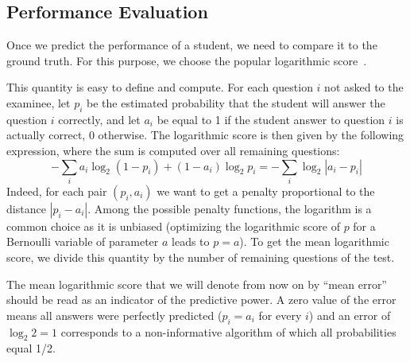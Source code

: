 \documentclass{edm_template}
\begin{document}
\subsection{Performance Evaluation}

Once we predict the performance of a student, we need to compare it to the ground truth. For this purpose, we choose the popular logarithmic score~\cite{Gneiting2007}. 

This quantity is easy to define and compute. For each question $i$ not asked to the examinee, let $p_i$ be the estimated probability that the student will answer the question $i$ correctly, and let $a_i$ be equal to 1 if the student answer to question $i$ is actually correct, 0 otherwise. The logarithmic score is then given by the following expression, where the sum is computed over all remaining questions: 
\[ - \sum_i a_i \log_2 (1 - p_i) + (1-a_i) \log_2 p_i = - \sum_i \log_2 | a_i - p_i | \]
Indeed, for each pair $(p_i, a_i)$ we want to get a penalty proportional to the distance $|p_i - a_i|$. Among the possible penalty functions, the logarithm is a common choice as it is unbiased (optimizing the logarithmic score of $p$ for a Bernoulli variable of parameter $a$ leads to $p=a$). To get the mean logarithmic score, we divide this quantity by the number of remaining questions of the test.

The mean logarithmic score that we will denote from now on by ``mean error'' should be read as an indicator of the predictive power. A zero value of the error means all answers were perfectly predicted ($p_i = a_i$ for every $i$) and an error of $\log_2 2 = 1$ corresponds to a non-informative algorithm of which all probabilities equal 1/2. 

%
\end{document}
